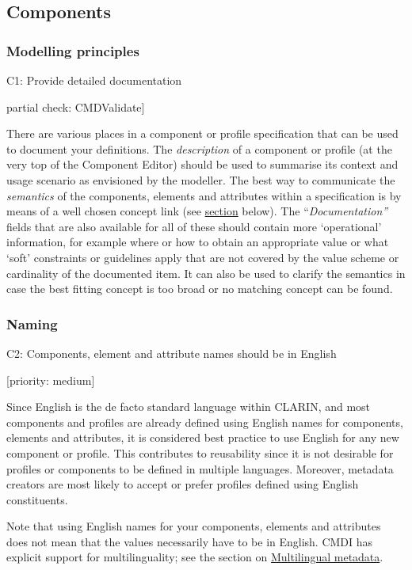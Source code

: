 \subsection{Components}\label{components}

\subsubsection{Modelling principles}\label{modelling-principles}

C1: Provide detailed documentation

\priority{medium}{[}partial check: CMDValidate{]}

There are various places in a component or profile specification that
can be used to document your definitions. The \emph{description} of a
component or profile (at the very top of the Component Editor) should be
used to summarise its context and usage scenario as envisioned by the
modeller. The best way to communicate the \emph{semantics} of the
components, elements and attributes within a specification is by means
of a well chosen concept link (see \protect\hyperlink{concepts}{section}
below). The ``\emph{Documentation''} fields that are also available for
all of these should contain more `operational' information, for example
where or how to obtain an appropriate value or what `soft' constraints
or guidelines apply that are not covered by the value scheme or
cardinality of the documented item. It can also be used to clarify the
semantics in case the best fitting concept is too broad or no matching
concept can be found.

\subsubsection{Naming}\label{naming}

C2: Components, element and attribute names should be in English

{[}priority: medium{]}

Since English is the de facto standard language within CLARIN, and most
components and profiles are already defined using English names for
components, elements and attributes, it is considered best practice to
use English for any new component or profile. This contributes to
reusability since it is not desirable for profiles or components to be
defined in multiple languages. Moreover, metadata creators are most
likely to accept or prefer profiles defined using English constituents.

Note that using English names for your components, elements and
attributes does not mean that the values necessarily have to be in
English. CMDI has explicit support for multilinguality; see the section
on
\href{../common_approachesproblems/multilingual_metadata.md}{Multilingual
metadata}.

